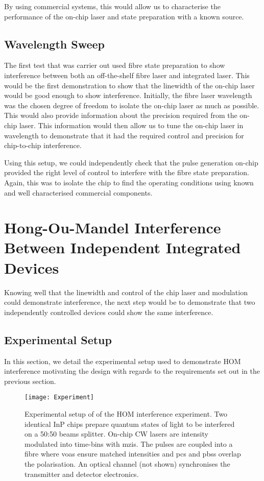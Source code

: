By using commercial systems, this would allow us to characterise the performance of the on-chip laser and state preparation with a known source.

\subsection{Wavelength Sweep}

The first test that was carrier out used fibre state preparation to show interference between both an off-the-shelf fibre laser and integrated laser. This would be the first demonstration to show that the linewidth of the on-chip laser would be good enough to show interference. Initially, the fibre laser wavelength was the chosen degree of freedom to isolate the on-chip laser as much as possible. This would also provide information about the precision required from the on-chip laser. This information would then allow us to tune the on-chip laser in wavelength to demonstrate that it had the required control and precision for chip-to-chip interference.

Using this setup, we could independently check that the pulse generation on-chip provided the right level of control to interfere with the fibre state preparation. Again, this was to isolate the chip to find the operating conditions using known and well characterised commercial components.

\section{Hong-Ou-Mandel Interference Between Independent Integrated Devices}

Knowing well that the linewidth and control of the chip laser and modulation could demonstrate interference, the next step would be to demonstrate that two independently controlled devices could show the same interference. 

\subsection{Experimental Setup}

In this section, we detail the experimental setup used to demonstrate \ac{HOM} interference motivating the design with regards to the requirements set out in the previous section. 

\begin{figure}[tbp]
	\centering
	\texttt{[image: Experiment]}
	\caption[Hon-Ou-Mandel interference experimental setup]{Experimental setup of of the \ac{HOM} interference experiment. Two identical \ac{InP} chips prepare quantum states of light to be interfered on a {50:50} beams splitter. On-chip \ac{CW} lasers are intensity modulated into time-bins with \acp{mzi}. The pulses are coupled into a fibre where \acp{voa} ensure matched intensities and \acp{pc} and \acp{pbs} overlap the polarisation. An optical channel (not shown) synchronises the transmitter and detector electronics.}
	\label{fig:hom_experiment}
\end{figure}

